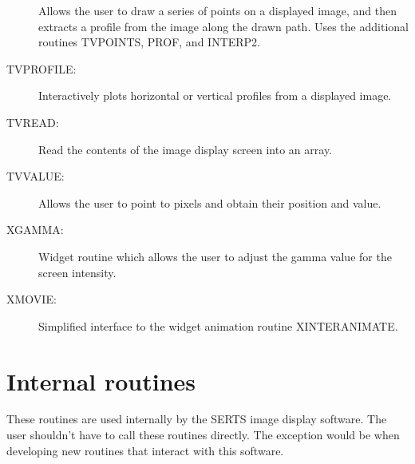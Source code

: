 \begin{description}
Allows the user to draw a series of points on a displayed image, and then
extracts a profile from the image along the drawn path.  Uses the additional
routines TVPOINTS, PROF, and INTERP2.
\item[TVPROFILE:]
Interactively plots horizontal or vertical profiles from a displayed image.
\item[TVREAD:]
Read the contents of the image display screen into an array.
\item[TVVALUE:]
Allows the user to point to pixels and obtain their position and value.
\item[XGAMMA:]
Widget routine which allows the user to adjust the gamma value for the screen
intensity.
\item[XMOVIE:]
Simplified interface to the widget animation routine XINTERANIMATE.
\end{description}

\section{Internal routines}

These routines are used internally by the SERTS image display software.  The
user shouldn't have to call these routines directly.  The exception would be
when developing new routines that interact with this software.

